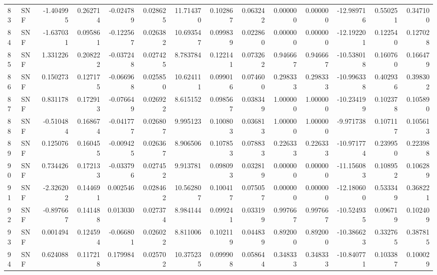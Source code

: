 \begin{tabular}{llrrrrrrrrrrrr}
83  &    SNF & -1.404995 &      0.262714 & -0.024789 &    0.028625 &  11.714370 &      0.102867 &   0.063242 &  0.000000 &  0.000000 & -12.989716 &     0.550251 &     0.347100 \\
84  &    SNF & -1.637031 &      0.095861 & -0.122567 &    0.026382 &  10.693547 &      0.099839 &   0.022860 &  0.000000 &  0.000000 & -12.192201 &     0.122540 &     0.127028 \\
85  &    SNF &  1.331226 &      0.208222 & -0.037248 &    0.027425 &   8.783784 &      0.122141 &   0.073262 &  0.946667 &  0.946667 & -10.538018 &     0.160760 &     0.166479 \\
86  &    SNF &  0.150273 &      0.127175 & -0.066968 &    0.025850 &  10.624111 &      0.099016 &   0.074600 &  0.298333 &  0.298333 & -10.996338 &     0.402936 &     0.398302 \\
87  &    SNF &  0.831178 &      0.172913 & -0.076649 &    0.026922 &   8.615152 &      0.098567 &   0.038349 &  1.000000 &  1.000000 & -10.234199 &     0.102378 &     0.105890 \\
88  &    SNF & -0.510484 &      0.168674 & -0.041777 &    0.026807 &   9.995123 &      0.100803 &   0.036813 &  1.000000 &  1.000000 &  -9.971738 &     0.107117 &     0.105613 \\
89  &    SNF &  0.125076 &      0.160455 & -0.009425 &    0.026367 &   8.906506 &      0.107853 &   0.078833 &  0.226333 &  0.226333 & -10.971774 &     0.239950 &     0.223988 \\
90  &    SNF &  0.734426 &      0.172133 & -0.033796 &    0.027452 &   9.913781 &      0.098093 &   0.032819 &  0.000000 &  0.000000 & -11.156083 &     0.108952 &     0.106289 \\
91  &    SNF & -2.326202 &      0.144691 &  0.002546 &    0.028462 &  10.562807 &      0.100417 &   0.075057 &  0.000000 &  0.000000 & -12.180600 &     0.533349 &     0.368221 \\
92  &    SNF & -0.897667 &      0.141488 &  0.013030 &    0.027374 &   8.984144 &      0.099241 &   0.033199 &  0.997667 &  0.997667 & -10.524935 &     0.096719 &     0.102409 \\
93  &    SNF &  0.001494 &      0.124594 & -0.066801 &    0.026022 &   8.811006 &      0.102119 &   0.044839 &  0.892000 &  0.892000 & -10.386623 &     0.332765 &     0.387815 \\
94  &    SNF &  0.624088 &      0.117218 &  0.179984 &    0.025702 &  10.375235 &      0.099908 &   0.058644 &  0.348333 &  0.348333 & -10.840771 &     0.103387 &     0.100029 \\

\end{tabular}
